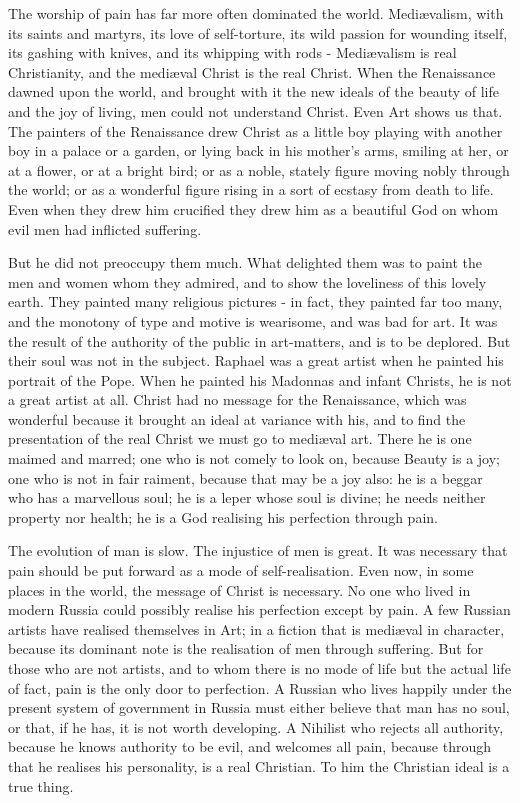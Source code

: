 The worship of pain has far more often dominated the world. Mediævalism, with its saints and martyrs, its love of self-torture, its wild passion for wounding itself, its gashing with knives, and its whipping with rods - Mediævalism is real Christianity, and the mediæval Christ is the real Christ. When the Renaissance dawned upon the world, and brought with it the new ideals of the beauty of life and the joy of living, men could not understand Christ. Even Art shows us that. The painters of the Renaissance drew Christ as a little boy playing with another boy in a palace or a garden, or lying back in his mother’s arms, smiling at her, or at a flower, or at a bright bird; or as a noble, stately figure moving nobly through the world; or as a wonderful figure rising in a sort of ecstasy from death to life. Even when they drew him crucified they drew him as a beautiful God on whom evil men had inflicted suffering.\par

But he did not preoccupy them much. What delighted them was to paint the men and women whom they admired, and to show the loveliness of this lovely earth. They painted many religious pictures - in fact, they painted far too many, and the monotony of type and motive is wearisome, and was bad for art. It was the result of the authority of the public in art-matters, and is to be deplored. But their soul was not in the subject. Raphael was a great artist when he painted his portrait of the Pope. When he painted his Madonnas and infant Christs, he is not a great artist at all. Christ had no message for the Renaissance, which was wonderful because it brought an ideal at variance with his, and to find the presentation of the real Christ we must go to mediæval art. There he is one maimed and marred; one who is not comely to look on, because Beauty is a joy; one who is not in fair raiment, because that may be a joy also: he is a beggar who has a marvellous soul; he is a leper whose soul is divine; he needs neither property nor health; he is a God realising his perfection through pain.\par

The evolution of man is slow. The injustice of men is great. It was necessary that pain should be put forward as a mode of self-realisation. Even now, in some places in the world, the message of Christ is necessary. No one who lived in modern Russia could possibly realise his perfection except by pain. A few Russian artists have realised themselves in Art; in a fiction that is mediæval in character, because its dominant note is the realisation of men through suffering. But for those who are not artists, and to whom there is no mode of life but the actual life of fact, pain is the only door to perfection. A Russian who lives happily under the present system of government in Russia must either believe that man has no soul, or that, if he has, it is not worth developing. A Nihilist who rejects all authority, because he knows authority to be evil, and welcomes all pain, because through that he realises his personality, is a real Christian. To him the Christian ideal is a true thing.\par

